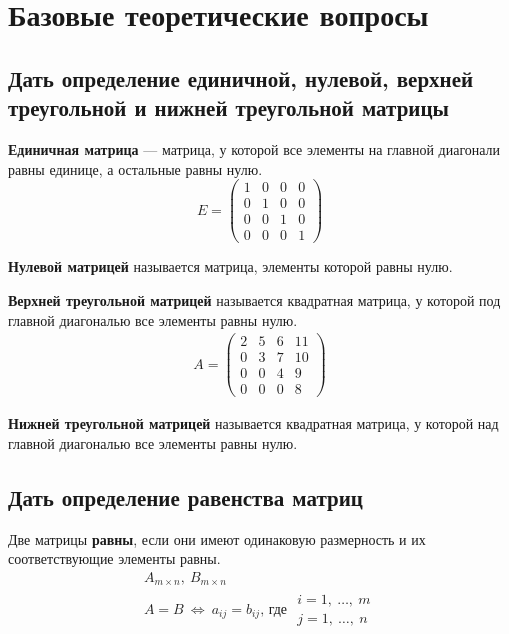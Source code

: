 


\tableofcontents
\newpage

\section{Базовые теоретические вопросы}
\subsection{Дать определение единичной, нулевой, верхней треугольной и нижней треугольной матрицы}
\begin{definition*}
	\textbf{Единичная матрица} --- матрица, у которой все элементы на главной диагонали равны единице, а остальные равны нулю.
	\[ E = \begin{pmatrix}
			1 & 0 & 0 & 0 \\
			0 & 1 & 0 & 0 \\
			0 & 0 & 1 & 0 \\
			0 & 0 & 0 & 1
		\end{pmatrix} \]
\end{definition*}
\begin{definition*}
	\textbf{Нулевой матрицей} называется матрица, элементы которой равны нулю.
\end{definition*}
\begin{definition*}
	\textbf{Верхней треугольной матрицей} называется квадратная матрица, у которой под главной диагональю все элементы равны нулю.
	\begin{gather*}
		A = \begin{pmatrix}
			2 & 5 & 6 & 11 \\
			0 & 3 & 7 & 10 \\
			0 & 0 & 4 & 9  \\
			0 & 0 & 0 & 8
		\end{pmatrix}
	\end{gather*}
\end{definition*}
\begin{definition*}
	\textbf{Нижней треугольной матрицей} называется квадратная матрица, у которой над главной диагональю все элементы равны нулю.
\end{definition*}

\subsection{Дать определение равенства матриц}
\begin{definition*}
	Две матрицы \textbf{равны}, если они имеют одинаковую размерность и их соответствующие элементы равны.
	\begin{gather*}
		A_{m\times n},\ B_{m\times n} \\
		A = B\ \iff\ a_{ij} = b_{ij} \text{, где } \begin{array}{l} i=1,\ \ldots ,\ m \\ j=1,\ \ldots ,\ n \end{array}
	\end{gather*}
\end{definition*}

